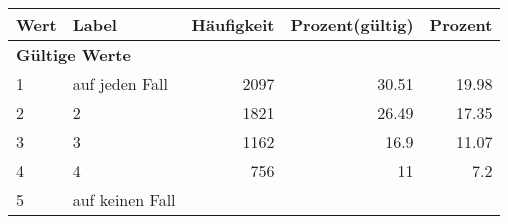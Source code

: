      \begin{longtable}{lXrrr}
     \toprule
     \textbf{Wert} & \textbf{Label} & \textbf{Häufigkeit} & \textbf{Prozent(gültig)} & \textbf{Prozent} \\
     \endhead
     \midrule
     \multicolumn{5}{l}{\textbf{Gültige Werte}}\\

     1 &
     \multicolumn{1}{X}{ auf jeden Fall   } &


       \num{2097} &
       \num[round-mode=places,round-precision=2]{30.51} &
         \num[round-mode=places,round-precision=2]{19.98} \\

     2 &
     \multicolumn{1}{X}{ 2   } &


       \num{1821} &
       \num[round-mode=places,round-precision=2]{26.49} &
         \num[round-mode=places,round-precision=2]{17.35} \\

     3 &
     \multicolumn{1}{X}{ 3   } &


       \num{1162} &
       \num[round-mode=places,round-precision=2]{16.9} &
         \num[round-mode=places,round-precision=2]{11.07} \\

     4 &
     \multicolumn{1}{X}{ 4   } &


       \num{756} &
       \num[round-mode=places,round-precision=2]{11} &
         \num[round-mode=places,round-precision=2]{7.2} \\

     5 &
     \multicolumn{1}{X}{ auf keinen Fall   } &



\end{longtable}

